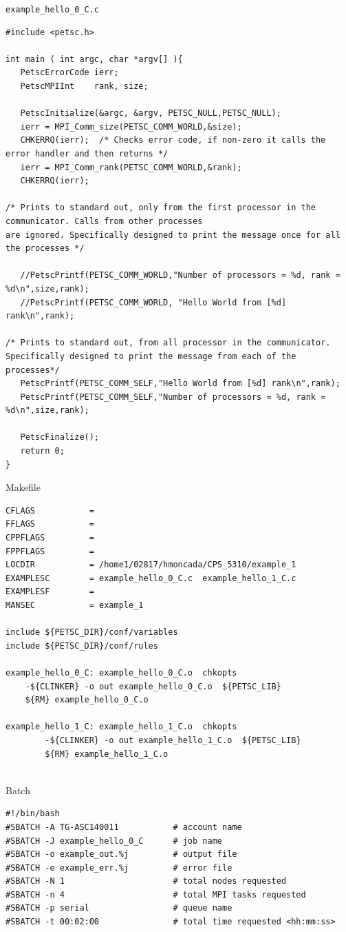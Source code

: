 \documentclass{article}
\begin{document}
\begin{description}
\item \verb+example_hello_0_C.c+
\scriptsize
\begin{verbatim}
#include <petsc.h>

int main ( int argc, char *argv[] ){
   PetscErrorCode ierr;
   PetscMPIInt    rank, size;
   
   PetscInitialize(&argc, &argv, PETSC_NULL,PETSC_NULL);
   ierr = MPI_Comm_size(PETSC_COMM_WORLD,&size);
   CHKERRQ(ierr);  /* Checks error code, if non-zero it calls the error handler and then returns */
   ierr = MPI_Comm_rank(PETSC_COMM_WORLD,&rank);
   CHKERRQ(ierr);

/* Prints to standard out, only from the first processor in the communicator. Calls from other processes
are ignored. Specifically designed to print the message once for all the processes */

   //PetscPrintf(PETSC_COMM_WORLD,"Number of processors = %d, rank = %d\n",size,rank);
   //PetscPrintf(PETSC_COMM_WORLD, "Hello World from [%d] rank\n",rank); 

/* Prints to standard out, from all processor in the communicator. Specifically designed to print the message from each of the processes*/ 
   PetscPrintf(PETSC_COMM_SELF,"Hello World from [%d] rank\n",rank);  
   PetscPrintf(PETSC_COMM_SELF,"Number of processors = %d, rank = %d\n",size,rank);

   PetscFinalize();
   return 0;
} 
\end{verbatim}
\normalsize
\item Makefile
\scriptsize
\begin{verbatim}
CFLAGS	         = 
FFLAGS	         = 
CPPFLAGS         = 
FPPFLAGS         =
LOCDIR           = /home1/02817/hmoncada/CPS_5310/example_1
EXAMPLESC        = example_hello_0_C.c  example_hello_1_C.c
EXAMPLESF        =  
MANSEC           = example_1

include ${PETSC_DIR}/conf/variables
include ${PETSC_DIR}/conf/rules

example_hello_0_C: example_hello_0_C.o  chkopts
	-${CLINKER} -o out example_hello_0_C.o  ${PETSC_LIB}
	${RM} example_hello_0_C.o 
	
example_hello_1_C: example_hello_1_C.o  chkopts
        -${CLINKER} -o out example_hello_1_C.o  ${PETSC_LIB}
        ${RM} example_hello_1_C.o
	
\end{verbatim}
\normalsize
\item Batch
\scriptsize
\begin{verbatim}
#!/bin/bash
#SBATCH -A TG-ASC140011           # account name
#SBATCH -J example_hello_0_C      # job name
#SBATCH -o example_out.%j         # output file
#SBATCH -e example_err.%j         # error file
#SBATCH -N 1                      # total nodes requested
#SBATCH -n 4                      # total MPI tasks requested
#SBATCH -p serial                 # queue name
#SBATCH -t 00:02:00               # total time requested <hh:mm:ss>


\end{verbatim}
\end{description}
\end{document}
